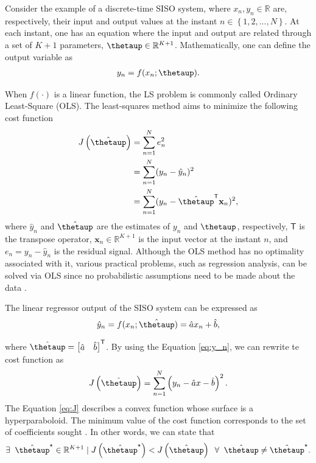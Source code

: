 \documentclass[english]{sobraep}
\newcommand{\trans}{\mathsf{T}}
\begin{document}
Consider the example of a discrete-time SISO system, where $x_n, y_n \in \mathbb{R}$ are, respectively, their input and output values at the instant $n \in \left\{1,2,...,N\right\}$. At each instant, one has an equation where the input and output are related through a set of \(K+1\) parameters, $\boldsymbol{\thetaup} \in \mathbb{R}^{K+1}$. Mathematically, one can define the output variable as
\begin{align}
    y_n = f(x_n;\boldsymbol{\thetaup}).
\end{align}

When $f(\cdot)$ is a linear function, the LS problem is commonly called Ordinary Least-Square (OLS). The least-squares method aims to minimize the following cost function
\begin{align}
    J\left( \hat{\boldsymbol{\thetaup}} \right) & = \sum_{n=1}^{N} e_n^2 \nonumber \\
    & = \sum_{n=1}^{N} (y_n - \hat{y}_n)^2 \nonumber \\
    & = \sum_{n=1}^{N} (y_n - \hat{\boldsymbol{\thetaup}}^{\trans} \mathbf{x}_n )^2,
\end{align}
where \(\hat{y}_n\) and \(\hat{\boldsymbol{\thetaup}}\) are the estimates of \(y_n\) and \(\boldsymbol{\thetaup}\), respectively, \(\trans\) is the transpose operator, \(\mathbf{x}_n \in \mathbb{R}^{K+1}\) is the input vector at the instant \(n\), and \(e_n = y_n - \hat{y}_n\) is the residual signal. Although the OLS method has no optimality associated with it, various practical problems, such as regression analysis, can be solved via OLS since no probabilistic assumptions need to be made about the data \cite{kay1993fundamentals}.

The linear regressor output of the SISO system can be expressed as
\begin{align}
    \label{eq:y_n}
    \hat{y}_n = f(x_n;\hat{\boldsymbol{\thetaup}}) = \hat{a}x_n + \hat{b},
\end{align}

where \(\hat{\boldsymbol{\thetaup}} = \begin{bmatrix} \hat{a} & \hat{b} \end{bmatrix}^\trans\). By using the Equation \eqref{eq:y_n}, we can rewrite te cost function as
\begin{align}
    \label{eq:J}
    J\left( \hat{\boldsymbol{\thetaup}} \right) = \sum_{n=1}^{N} \left( y_n - \hat{a}x - \hat{b} \right)^2.
\end{align}
The Equation \eqref{eq:J} describes a convex function whose surface is a hyperparaboloid. The minimum value of the cost function corresponds to the set of coefficients sought \cite{diniz1997adaptive}. In other words, we can state that
\begin{align}
    \exists \;\; \hat{\boldsymbol{\thetaup}}^{\star} \in \mathbb{R}^{K+1} \mid J\left(\hat{\boldsymbol{\thetaup}}^{\star}\right) < J\left(\hat{\boldsymbol{\thetaup}}\right) \;\; \forall \;\; \hat{\boldsymbol{\thetaup}} \neq \hat{\boldsymbol{\thetaup}}^{\star}.
\end{align}
\end{document}
